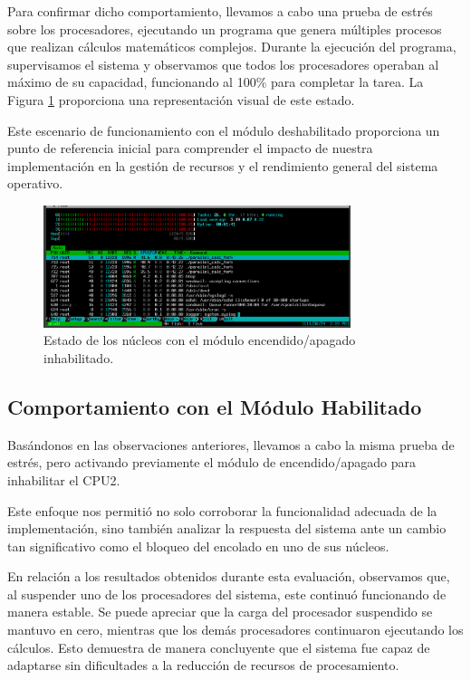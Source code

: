 Para confirmar dicho comportamiento, llevamos a cabo una prueba de estrés sobre los procesadores, ejecutando un programa que genera múltiples procesos que realizan cálculos matemáticos complejos. Durante la ejecución del programa, supervisamos el sistema y observamos que todos los procesadores operaban al máximo de su capacidad, funcionando al 100\% para completar la tarea. La Figura \ref{fig:cpuOnOff-result-full-load} proporciona una representación visual de este estado.\par

Este escenario de funcionamiento con el módulo deshabilitado proporciona un punto de referencia inicial para comprender el impacto de nuestra implementación en la gestión de recursos y el rendimiento general del sistema operativo.\par

\begin{figure}[H]
    \centering
    \includegraphics[width=0.8\textwidth]{images/cpuOnOff-result-full-load.png}
    \caption{Estado de los núcleos con el módulo encendido/apagado inhabilitado.}
    \label{fig:cpuOnOff-result-full-load}
\end{figure}

\subsection{Comportamiento con el Módulo Habilitado}
Basándonos en las observaciones anteriores, llevamos a cabo la misma prueba de estrés, pero activando previamente el módulo de encendido/apagado para inhabilitar el CPU2.\par

Este enfoque nos permitió no solo corroborar la funcionalidad adecuada de la implementación, sino también analizar la respuesta del sistema ante un cambio tan significativo como el bloqueo del encolado en uno de sus núcleos.\par

En relación a los resultados obtenidos durante esta evaluación, observamos que, al suspender uno de los procesadores del sistema, este continuó funcionando de manera estable. Se puede apreciar que la carga del procesador suspendido se mantuvo en cero, mientras que los demás procesadores continuaron ejecutando los cálculos. Esto demuestra de manera concluyente que el sistema fue capaz de adaptarse sin dificultades a la reducción de recursos de procesamiento.\par

